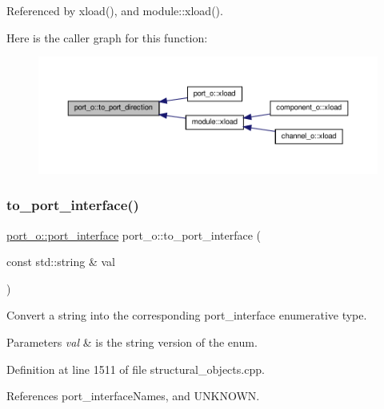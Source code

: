 Referenced by xload(), and module\+::xload().

Here is the caller graph for this function\+:
\nopagebreak
\begin{figure}[H]
\begin{center}
\leavevmode
\includegraphics[width=350pt]{df/d75/structport__o_a6e94ff71031344773513bc3985a65c41_icgraph}
\end{center}
\end{figure}
\mbox{\label{structport__o_adfd39a77960a9240b2db38cfe45e3a24}} 
\subsubsection{\texorpdfstring{to\+\_\+port\+\_\+interface()}{to\_port\_interface()}}
{\footnotesize\ttfamily \hyperlink{structport__o_a37d2e6a450aea997028478f5bfb4e1f6}{port\+\_\+o\+::port\+\_\+interface} port\+\_\+o\+::to\+\_\+port\+\_\+interface (\begin{DoxyParamCaption}\item[{const std\+::string \&}]{val }\end{DoxyParamCaption})\hspace{0.3cm}{\ttfamily [static]}}



Convert a string into the corresponding port\+\_\+interface enumerative type. 


\begin{DoxyParams}{Parameters}
{\em val} & is the string version of the enum. \\
\hline
\end{DoxyParams}


Definition at line 1511 of file structural\+\_\+objects.\+cpp.



References port\+\_\+interface\+Names, and U\+N\+K\+N\+O\+WN.



